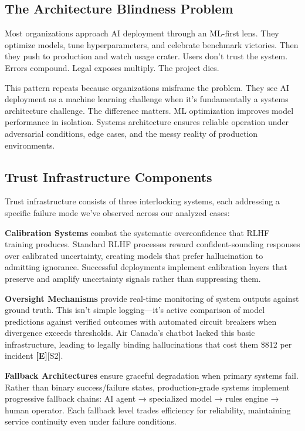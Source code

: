 \documentclass[a4paper,11pt]{article}
\newcommand{\elabel}{\textbf{\textcolor{ecolor}{[E]}}}
\begin{document}
\subsection{The Architecture Blindness Problem}

Most organizations approach AI deployment through an ML-first lens. They optimize models, tune hyperparameters, and celebrate benchmark victories. Then they push to production and watch usage crater. Users don't trust the system. Errors compound. Legal exposes multiply. The project dies.


This pattern repeats because organizations misframe the problem. They see AI deployment as a machine learning challenge when it's fundamentally a systems architecture challenge. The difference matters. ML optimization improves model performance in isolation. Systems architecture ensures reliable operation under adversarial conditions, edge cases, and the messy reality of production environments.


\subsection{Trust Infrastructure Components}

Trust infrastructure consists of three interlocking systems, each addressing a specific failure mode we've observed across our analyzed cases:


\textbf{Calibration Systems} combat the systematic overconfidence that RLHF training produces. Standard RLHF processes reward confident-sounding responses over calibrated uncertainty, creating models that prefer hallucination to admitting ignorance. Successful deployments implement calibration layers that preserve and amplify uncertainty signals rather than suppressing them.


\textbf{Oversight Mechanisms} provide real-time monitoring of system outputs against ground truth. This isn't simple logging—it's active comparison of model predictions against verified outcomes with automated circuit breakers when divergence exceeds thresholds. Air Canada's chatbot lacked this basic infrastructure, leading to legally binding hallucinations that cost them \$812 per incident \elabel{}\textcolor{primary}{[S2]}.


\textbf{Fallback Architectures} ensure graceful degradation when primary systems fail. Rather than binary success/failure states, production-grade systems implement progressive fallback chains: AI agent → specialized model → rules engine → human operator. Each fallback level trades efficiency for reliability, maintaining service continuity even under failure conditions.
\end{document}

